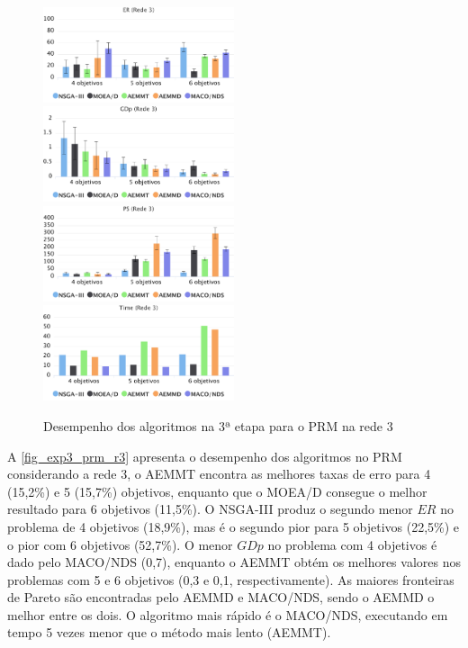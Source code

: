 \begin{figure}[!htbp]
	\includegraphics[width=0.5\textwidth]{cap_experimentos/figs/etapa3/er-mrp-r3}
	\includegraphics[width=0.5\textwidth]{cap_experimentos/figs/etapa3/gd-mrp-r3}
	\includegraphics[width=0.5\textwidth]{cap_experimentos/figs/etapa3/ps-mrp-r3}
	\includegraphics[width=0.5\textwidth]{cap_experimentos/figs/etapa3/time-mrp-r3}
	\caption{\label{fig_exp3_prm_r3}Desempenho dos algoritmos na 3ª etapa para o PRM na rede 3}
\end{figure}

A \autoref{fig_exp3_prm_r3} apresenta o desempenho dos algoritmos no PRM considerando a rede 3, o AEMMT encontra as melhores taxas de erro para 4 (15,2\%) e 5 (15,7\%) objetivos, enquanto que o MOEA/D consegue o melhor resultado para 6 objetivos (11,5\%). O NSGA-III produz o segundo menor $ER$ no problema de 4 objetivos (18,9\%), mas é o segundo pior para 5 objetivos (22,5\%) e o pior com 6 objetivos (52,7\%). O menor $GDp$ no problema com 4 objetivos é dado pelo MACO/NDS (0,7), enquanto o AEMMT obtém os melhores valores nos problemas com 5 e 6 objetivos (0,3 e 0,1, respectivamente). As maiores fronteiras de Pareto são encontradas pelo AEMMD e MACO/NDS, sendo o AEMMD o melhor entre os dois. O algoritmo mais rápido é o MACO/NDS, executando em tempo 5 vezes menor que o método mais lento (AEMMT).

